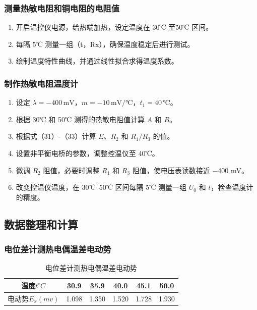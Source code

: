 \documentclass[zihao=5, UTF8]{article}
\theoremstyle{MyLineTheoremStyle} %
\theoremstyle{MyBlockTheoremStyle} %
\theoremstyle{MySubsubsectionStyle} %
\begin{document}
\subsubsection{测量热敏电阻和铜电阻的电阻值}
\begin{enumerate}
    \item 开启温控仪电源，给热端加热，设定温度在 30℃ 至50℃ 区间。
    \item 每隔 5℃ 测量一组（t，Rx），确保温度稳定后进行测试。
    \item 绘制温度特性曲线，并通过线性拟合求得温度系数。
\end{enumerate}

\subsubsection{制作热敏电阻温度计}
\begin{enumerate}
    \item 设定 $\lambda = -400 \, \text{mV}$，$m = -10 \, \text{mV/℃}$，$t_1 = 40 \, \text{℃}$。
    \item 根据 30℃ 和 50℃ 测得的热敏电阻值计算 $A$ 和 $B$。
    \item 根据式（31）-（33）计算 $E$、$R_2$ 和 $R_1/R_3$ 的值。
    \item 设置非平衡电桥的参数，调整控温仪至 40℃。
    \item 微调 $R_2$ 阻值，必要时调整 $R_1$ 和 $R_3$ 阻值，使电压表读数接近 −400 mV。
    \item 改变控温仪温度，在 30℃~50℃ 区间每隔 5℃ 测量一组 $U_0$ 和 $t$，检查温度计的精度。
\end{enumerate}

\subsection{数据整理和计算}

\subsubsection{电位差计测热电偶温差电动势}

\begin{table}[H]
	\centering
	\caption*{室温：t=$30.9^\circ C$ \ 电动势：$E_x=1.098 mV$ \ 冷端温度：$t_0=0^\circ C$ }
	\begin{tabular}{|c|c|c|c|c|c|}\hline
		温度$t^\circ C$  & 30.9 & 35.9 & 40.0 & 45.1 & 50.0  \\\hline
		电动势$E_x(mv)$ & 1.098 & 1.350 & 1.520 & 1.728 & 1.930\\\hline
	\end{tabular}
	\caption{电位差计测热电偶温差电动势}
  \label{tab:电位差计测热电偶温差电动势}
\end{table}
\end{document}
